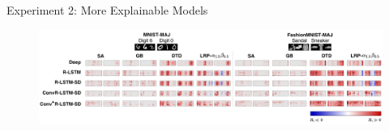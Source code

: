 \documentclass[Nike]{tuberlinbeamer}
\begin{document}
\begin{frame}{Experiment 2: More Explainable Models}
{		 \begin{figure}[h]
			\includegraphics [width=\textwidth]{figures/present_exp2_result_heatmap_3}
		\end{figure}
		
		\vfill
		
		}




\end{frame}
\end{document}
